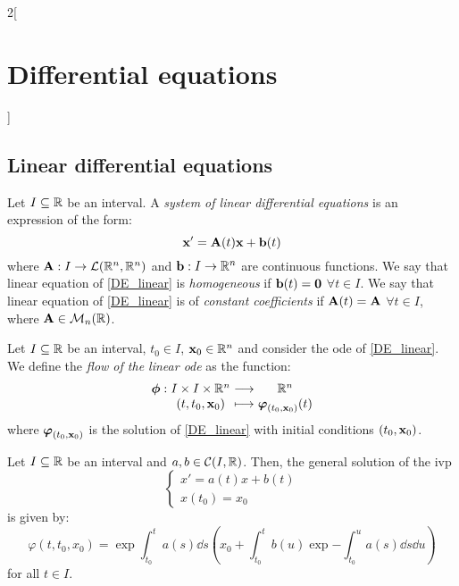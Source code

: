 \documentclass[../../../main_math.tex]{subfiles}
\begin{document}
\begin{multicols}{2}[\section{Differential equations}]
  \subsection{Linear differential equations}
  \begin{definition}
    Let $I\subseteq\mathbb{R}$ be an interval. A \emph{system of linear differential equations} is an expression of the form:
    \begin{equation}\label{DE_linear}
      \boldsymbol{\mathrm{x}}'=\boldsymbol{\mathrm{A}}(t)\boldsymbol{\mathrm{x}}+\boldsymbol{\mathrm{b}}(t)
    \end{equation}
    where $\boldsymbol{\mathrm{A}}:I\rightarrow\mathcal{L}(\mathbb{R}^n,\mathbb{R}^n)$ and $\boldsymbol{\mathrm{b}}:I\rightarrow\mathbb{R}^n$ are continuous functions.
    We say that linear equation of \cref{DE_linear} is \emph{homogeneous} if $\boldsymbol{\mathrm{b}}(t)=\boldsymbol{\mathrm{0}}$ $\forall t\in I$. We say that linear equation of \cref{DE_linear} is of \emph{constant coefficients} if $\boldsymbol{\mathrm{A}}(t)=\boldsymbol{\mathrm{A}}$ $\forall t\in I$, where $\boldsymbol{\mathrm{A}}\in\mathcal{M}_n(\mathbb{R})$.
  \end{definition}
  \begin{definition}
    Let $I\subseteq\mathbb{R}$ be an interval, $t_0\in I$, $\boldsymbol{\mathrm{x}}_0\in\mathbb{R}^n$ and consider the ode of \cref{DE_linear}. We define the \emph{flow of the linear ode} as the function:
    $$
      \function{\vf{\phi}}{I\times I\times \RR^n}{\RR^n}{(t,t_0,\vf{x}_0)}{\vf{\varphi}_{(t_0,\vf{x}_0)}(t)}
    $$
    where $\boldsymbol{\mathrm{\varphi}}_{(t_0,\boldsymbol{\mathrm{x}}_0)}$ is the solution of \cref{DE_linear} with initial conditions $(t_0,\boldsymbol{\mathrm{x}}_0)$.
  \end{definition}
  \begin{proposition}
    Let $I\subseteq\mathbb{R}$ be an interval and $a,b\in\mathcal{C}(I,\mathbb{R})$. Then, the general solution of the ivp
    $$\begin{cases}
        x'      =a(t)x+b(t) \\
        x(t_0)  =x_0
      \end{cases}$$
    is given by:
    \begin{equation}\label{DE_sol-lin}
      \varphi(t,t_0,x_0)=\exp{\int_{t_0}^ta(s)\dd{s}}\left(x_0+\int_{t_0}^tb(u)\exp{-\int_{t_0}^ua(s)\dd{s}}\dd{u}\right)
    \end{equation}
    for all $t\in I$.
  \end{proposition}

\end{multicols}
\end{document}
